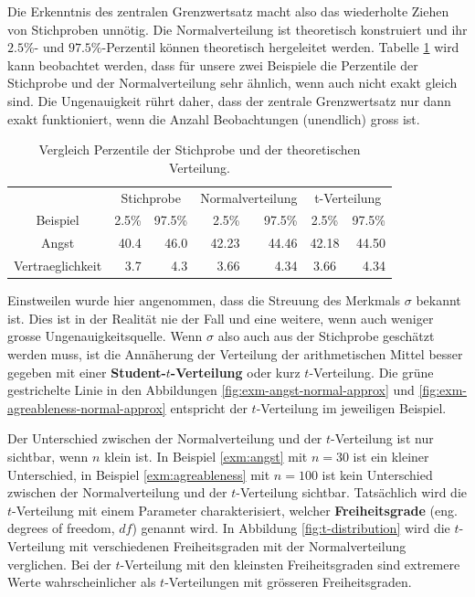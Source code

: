 \documentclass[
]{book}
\theoremstyle{definition}
\theoremstyle{definition}
\theoremstyle{definition}
\theoremstyle{definition}
\theoremstyle{remark}
\begin{document}
Die Erkenntnis des zentralen Grenzwertsatz macht also das wiederholte Ziehen von Stichproben unnötig. Die Normalverteilung ist theoretisch konstruiert und ihr \(2.5\%\)- und \(97.5\%\)-Perzentil können theoretisch hergeleitet werden. Tabelle \ref{tab:quantiles-norm} wird kann beobachtet werden, dass für unsere zwei Beispiele die Perzentile der Stichprobe und der Normalverteilung sehr ähnlich, wenn auch nicht exakt gleich sind. Die Ungenauigkeit rührt daher, dass der zentrale Grenzwertsatz nur dann exakt funktioniert, wenn die Anzahl Beobachtungen (unendlich) gross ist.

\begin{table}
\centering
\caption{\label{tab:quantiles-norm}Vergleich Perzentile der Stichprobe und der theoretischen Verteilung.}
\centering
\begin{tabular}[t]{crrrrcr}
\toprule
\multicolumn{1}{c}{ } & \multicolumn{2}{c}{Stichprobe} & \multicolumn{2}{c}{Normalverteilung} & \multicolumn{2}{c}{t-Verteilung} \\
\cmidrule(l{3pt}r{3pt}){2-3} \cmidrule(l{3pt}r{3pt}){4-5} \cmidrule(l{3pt}r{3pt}){6-7}
Beispiel & 2.5\% & 97.5\% & 2.5\% & 97.5\% & 2.5\% & 97.5\%\\
\midrule
Angst & 40.4 & 46.0 & 42.23 & 44.46 & 42.18 & 44.50\\
Vertraeglichkeit & 3.7 & 4.3 & 3.66 & 4.34 & 3.66 & 4.34\\
\bottomrule
\end{tabular}
\end{table}

Einstweilen wurde hier angenommen, dass die Streuung des Merkmals \(\sigma\) bekannt ist. Dies ist in der Realität nie der Fall und eine weitere, wenn auch weniger grosse Ungenauigkeitsquelle. \label{customdef-student-verteilung}{Wenn \(\sigma\) also auch aus der Stichprobe geschätzt werden muss, ist die Annäherung der Verteilung der arithmetischen Mittel besser gegeben mit einer \textbf{Student-\(t\)-Verteilung} oder kurz \(t\)-Verteilung.} Die grüne gestrichelte Linie in den Abbildungen \ref{fig:exm-angst-normal-approx} und \ref{fig:exm-agreableness-normal-approx} entspricht der \(t\)-Verteilung im jeweiligen Beispiel.

Der Unterschied zwischen der Normalverteilung und der \(t\)-Verteilung ist nur sichtbar, wenn \(n\) klein ist. In Beispiel \ref{exm:angst} mit \(n = 30\) ist ein kleiner Unterschied, in Beispiel \ref{exm:agreableness} mit \(n = 100\) ist kein Unterschied zwischen der Normalverteilung und der \(t\)-Verteilung sichtbar. \label{customdef-freiheitsgrade}{Tatsächlich wird die \(t\)-Verteilung mit einem Parameter charakterisiert, welcher \textbf{Freiheitsgrade} (eng. degrees of freedom, \(df\)) genannt wird.} In Abbildung \ref{fig:t-distribution} wird die \(t\)-Verteilung mit verschiedenen Freiheitsgraden mit der Normalverteilung verglichen. Bei der \(t\)-Verteilung mit den kleinsten Freiheitsgraden sind extremere Werte wahrscheinlicher als \(t\)-Verteilungen mit grösseren Freiheitsgraden.
\end{document}
